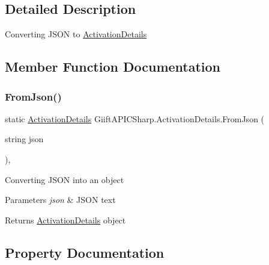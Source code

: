 \subsection{Detailed Description}
Converting J\+S\+ON to \hyperlink{class_giift_a_p_i_c_sharp_1_1_activation_details}{Activation\+Details} 



\subsection{Member Function Documentation}
\mbox{\label{class_giift_a_p_i_c_sharp_1_1_activation_details_abdd25b35a564ad4a01f0932102303e39}} 
\subsubsection{\texorpdfstring{From\+Json()}{FromJson()}}
{\footnotesize\ttfamily static \hyperlink{class_giift_a_p_i_c_sharp_1_1_activation_details}{Activation\+Details} Giift\+A\+P\+I\+C\+Sharp.\+Activation\+Details.\+From\+Json (\begin{DoxyParamCaption}\item[{string}]{json }\end{DoxyParamCaption})\hspace{0.3cm}{\ttfamily [inline]}, {\ttfamily [static]}}



Converting J\+S\+ON into an object 


\begin{DoxyParams}{Parameters}
{\em json} & J\+S\+ON text\\
\hline
\end{DoxyParams}
\begin{DoxyReturn}{Returns}
\hyperlink{class_giift_a_p_i_c_sharp_1_1_activation_details}{Activation\+Details} object
\end{DoxyReturn}


\subsection{Property Documentation}
\mbox{\label{class_giift_a_p_i_c_sharp_1_1_activation_details_a228857c9f8350a484d60ad95f229e749}} 
